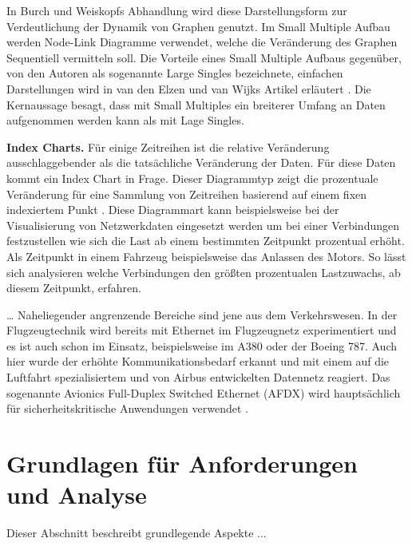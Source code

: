 \documentclass[draft=false
              ,paper=a4
              ,twoside=false
              ,fontsize=11pt
              ,headsepline
              ,BCOR10mm
              ,DIV11
              ]{scrbook}
\begin{document}
In Burch und Weiskopfs Abhandlung \cite{Burch:2014:FES:2636240.2636839} wird diese Darstellungsform zur Verdeutlichung der Dynamik von Graphen genutzt. Im Small Multiple Aufbau werden Node-Link Diagramme verwendet, welche die Veränderung des Graphen Sequentiell vermitteln soll. Die Vorteile eines Small Multiple Aufbaus gegenüber, von den Autoren als sogenannte Large Singles bezeichnete, einfachen Darstellungen wird in van den Elzen und van Wijks Artikel erläutert \cite{elzen_small_multiple_2013}. Die Kernaussage besagt, dass mit Small Multiples ein breiterer Umfang an Daten aufgenommen werden kann als mit Lage Singles.

\textbf{Index Charts.} Für einige Zeitreihen ist die relative Veränderung ausschlaggebender als die tatsächliche Veränderung der Daten. Für diese Daten kommt ein Index Chart in Frage. Dieser Diagrammtyp zeigt die prozentuale Veränderung für eine Sammlung von Zeitreihen basierend auf einem fixen indexiertem Punkt \cite{heer_tour_2010}. Diese Diagrammart kann beispielsweise bei der Visualisierung von Netzwerkdaten eingesetzt werden um bei einer Verbindungen festzustellen wie sich die Last ab einem bestimmten Zeitpunkt prozentual erhöht. Als Zeitpunkt in einem Fahrzeug beispielsweise das Anlassen des Motors. So lässt sich analysieren welche Verbindungen den größten prozentualen Lastzuwachs, ab diesem Zeitpunkt, erfahren.

\ldots
Naheliegender angrenzende Bereiche sind jene aus dem Verkehrswesen. In der Flugzeugtechnik wird bereits mit Ethernet im Flugzeugnetz experimentiert und es ist auch schon im Einsatz, beispielsweise im A380 oder der Boeing 787. Auch hier wurde der erhöhte Kommunikationsbedarf erkannt und mit einem auf die Luftfahrt spezialisiertem und von Airbus entwickelten Datennetz reagiert. Das sogenannte Avionics Full-Duplex Switched Ethernet (AFDX) wird hauptsächlich für sicherheitskritische Anwendungen verwendet \cite{steiner_recent_2014}. 



\section{Grundlagen für Anforderungen und Analyse} %
\label{sec:anforderungen_und_analyse}
Dieser Abschnitt beschreibt grundlegende Aspekte ... 
\end{document}
